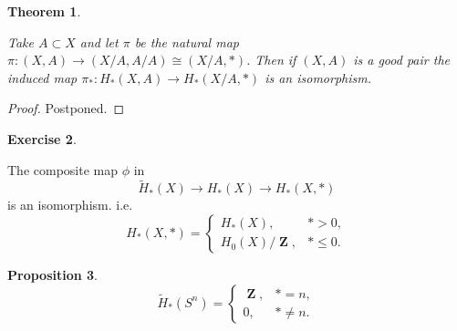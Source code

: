 \documentclass[10pt,]{book}
\newcommand{\gt}{>}
\theoremstyle{plain}
\newtheorem{theorem}{Theorem}[section]
\newtheorem{proposition}[theorem]{Proposition}
\theoremstyle{definition}
\newtheorem{exercise}[theorem]{Exercise}
\numberwithin{equation}{section}
\DeclareMathOperator{\ZZ}{\mathbf{Z}}
\begin{document}
\begin{theorem}\label{theorem-2}

              Take \(A\subset X\) and let \(\pi\) be the natural map \(\pi\colon(X,A)\to(X/A,A/A)\cong (X/A,*)\).
              Then if \((X,A)\) is a good pair the induced map \(\pi_*\colon H_*(X,A)\to H_*(X/A,*)\) is an isomorphism.
            \end{theorem}
\begin{proof}

              Postponed.
            \end{proof}
\begin{exercise}\label{exercise-4}

              The composite map \(\phi\) in
              \[
                \tilde H_*(X) \to H_*(X) \to H_*(X,*)
              \]
              is an isomorphism.
              i.e.
              \[
                H_*(X,*) = \begin{cases} H_*(X), &* \gt 0,\\H_0(X)/\ZZ, &* \le 0.\end{cases}
              \]\end{exercise}
\begin{proposition}\label{sphere-homology}
\[
                \tilde H_*(S^n) = \begin{cases} \ZZ, &* = n,\\0, &* \ne n.\end{cases}
              \]\end{proposition}
\end{document}
